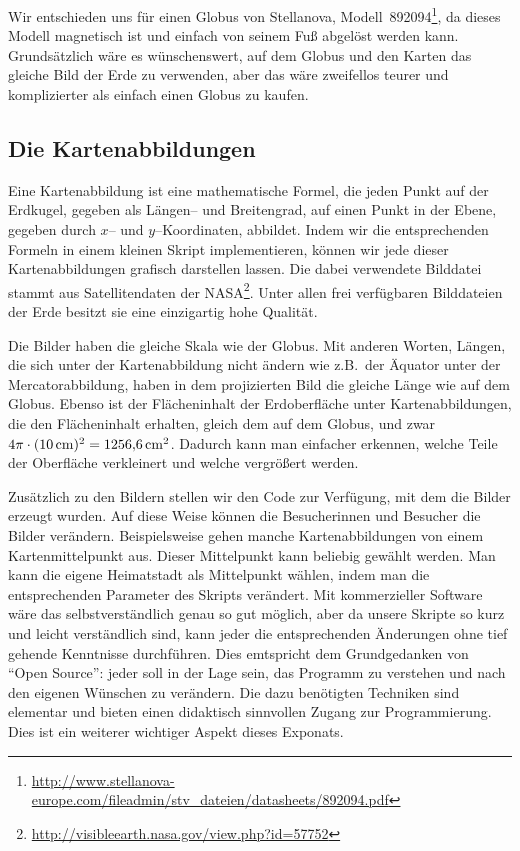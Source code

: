 \documentclass[a4paper,12pt]{article}
\begin{document}
Wir entschieden uns für einen Globus von Stellanova, 
Modell~892094\footnote{\url{http://www.stellanova-europe.com/fileadmin/stv_dateien/datasheets/892094.pdf}},
da dieses Modell magnetisch ist und einfach von seinem Fuß abgelöst werden kann.
Grund\-sätz\-lich wäre es wünschenswert, auf dem Globus und den Karten das gleiche 
Bild der Erde zu verwenden, aber das wäre zweifellos teurer und komplizierter als 
einfach einen Globus zu kaufen.


\subsection{Die Kartenabbildungen}

Eine Kartenabbildung ist eine mathematische Formel, die jeden Punkt auf 
der Erdkugel, gegeben als Längen-- und Breitengrad, auf einen Punkt in der Ebene, 
gegeben durch $x$-- und $y$--Koordinaten, abbildet. Indem wir die entsprechenden Formeln 
in einem kleinen Skript implementieren, können wir jede dieser Kartenabbildungen grafisch 
darstellen lassen. Die dabei verwendete Bilddatei stammt aus Satellitendaten der 
NASA\footnote{\url{http://visibleearth.nasa.gov/view.php?id=57752}}.
Unter allen frei verfügbaren Bilddateien der Erde besitzt sie eine einzigartig hohe 
Qualität.

Die Bilder haben die gleiche Skala wie der Globus. Mit anderen Worten, Längen,
die sich unter der Kartenabbildung nicht ändern wie z.B.\ der Äquator unter der 
Mercatorabbildung, haben in dem projizierten Bild die gleiche Länge wie auf dem 
Globus. Ebenso ist der Flächeninhalt der Erdoberfläche unter Kartenabbildungen, die
den Flächeninhalt erhalten, gleich dem auf dem Globus, und zwar 
$4\pi\cdot (10\,{\rm cm})^2 = 1256{,}6\,{\rm cm}^2$. Dadurch kann man einfacher erkennen,
welche Teile der Oberfläche verkleinert und welche vergrößert werden. 

Zusätzlich zu den Bildern stellen wir den Code zur Verfügung, mit dem die Bilder erzeugt 
wurden. Auf diese Weise können die Besucherinnen und Besucher die Bilder verändern. 
Beispielsweise gehen manche Kartenabbildungen von einem Kartenmittelpunkt aus. Dieser 
Mittelpunkt kann beliebig gewählt werden. Man kann die eigene Heimatstadt als Mittelpunkt
wählen, indem man die entsprechenden Parameter des Skripts verändert. Mit kommerzieller 
Software wäre das selbstverständlich genau so gut möglich, aber da unsere Skripte so 
kurz und leicht verständlich sind, kann jeder die entsprechenden Än\-der\-unge\-n ohne 
tief gehende Kenntnisse durchführen.
Dies emtspricht dem Grundgedanken von "`Open Source"': jeder soll in der Lage 
sein, das Programm zu verstehen und nach den eigenen Wünschen zu verändern. Die dazu 
benötigten Techniken sind elementar und bieten einen didaktisch sinnvollen Zugang zur
Programmierung. Dies ist ein weiterer wichtiger Aspekt dieses Exponats. 
\end{document}
